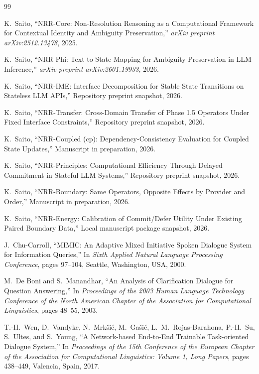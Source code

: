 \documentclass[11pt]{article}
\begin{document}
\begin{thebibliography}{99}
\raggedright

K.~Saito,
\newblock ``NRR-Core: Non-Resolution Reasoning as a Computational Framework for Contextual Identity and Ambiguity Preservation,''
\newblock \emph{arXiv preprint arXiv:2512.13478}, 2025.

K.~Saito,
\newblock ``NRR-Phi: Text-to-State Mapping for Ambiguity Preservation in LLM Inference,''
\newblock \emph{arXiv preprint arXiv:2601.19933}, 2026.

K.~Saito,
\newblock ``NRR-IME: Interface Decomposition for Stable State Transitions on Stateless LLM APIs,''
\newblock Repository preprint snapshot, 2026.

K.~Saito,
\newblock ``NRR-Transfer: Cross-Domain Transfer of Phase 1.5 Operators Under Fixed Interface Constraints,''
\newblock Repository preprint snapshot, 2026.

K.~Saito,
\newblock ``NRR-Coupled (cp): Dependency-Consistency Evaluation for Coupled State Updates,''
\newblock Manuscript in preparation, 2026.

K.~Saito,
\newblock ``NRR-Principles: Computational Efficiency Through Delayed Commitment in Stateful LLM Systems,''
\newblock Repository preprint snapshot, 2026.

K.~Saito,
\newblock ``NRR-Boundary: Same Operators, Opposite Effects by Provider and Order,''
\newblock Manuscript in preparation, 2026.

K.~Saito,
\newblock ``NRR-Energy: Calibration of Commit/Defer Utility Under Existing Paired Boundary Data,''
\newblock Local manuscript package snapshot, 2026.

J.~Chu-Carroll,
\newblock ``MIMIC: An Adaptive Mixed Initiative Spoken Dialogue System for Information Queries,''
\newblock In \emph{Sixth Applied Natural Language Processing Conference}, pages 97--104, Seattle, Washington, USA, 2000.

M.~De Boni and S.~Manandhar,
\newblock ``An Analysis of Clarification Dialogue for Question Answering,''
\newblock In \emph{Proceedings of the 2003 Human Language Technology Conference of the North American Chapter of the Association for Computational Linguistics}, pages 48--55, 2003.

T.-H.~Wen, D.~Vandyke, N.~Mrk{\v{s}}i{\'c}, M.~Ga{\v{s}}i{\'c}, L.~M.~Rojas-Barahona, P.-H.~Su, S.~Ultes, and S.~Young,
\newblock ``A Network-based End-to-End Trainable Task-oriented Dialogue System,''
\newblock In \emph{Proceedings of the 15th Conference of the European Chapter of the Association for Computational Linguistics: Volume 1, Long Papers}, pages 438--449, Valencia, Spain, 2017.


\end{thebibliography}
\end{document}
